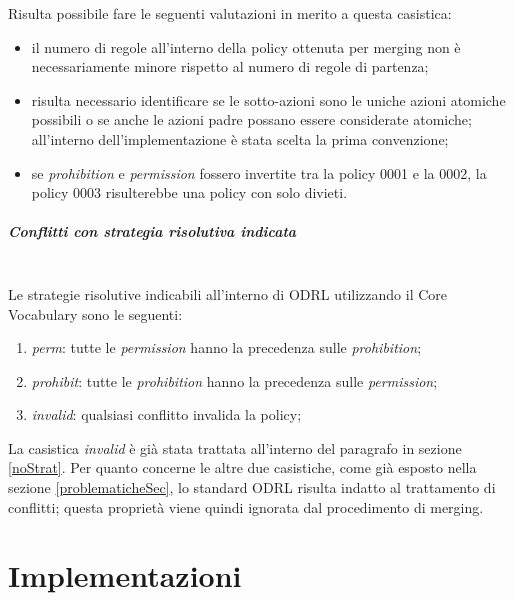 \documentclass[12pt,a4paper,twoside]{book}
\begin{document}
Risulta possibile fare le seguenti valutazioni in merito a questa casistica:
\begin{itemize}
	\item il numero di regole all'interno della policy ottenuta per merging non è necessariamente minore rispetto al numero di regole di partenza;
	\item risulta necessario identificare se le sotto-azioni sono le uniche azioni atomiche possibili o se anche le azioni padre possano essere considerate atomiche; all'interno dell'implementazione è stata scelta la prima convenzione;
	\item se \textit{prohibition} e \textit{permission} fossero invertite tra la policy 0001 e la 0002, la policy 0003 risulterebbe una policy con solo divieti.
\end{itemize}
\paragraph{Conflitti con strategia risolutiva indicata}\mbox{}\\
Le strategie risolutive indicabili all'interno di ODRL utilizzando il Core Vocabulary sono le seguenti:
\begin{enumerate}
	\item \textit{perm}: tutte le \textit{permission} hanno la precedenza sulle \textit{prohibition};
	\item \textit{prohibit}: tutte le \textit{prohibition} hanno la precedenza sulle \textit{permission};
	\item \textit{invalid}: qualsiasi conflitto invalida la policy;
\end{enumerate}
La casistica \textit{invalid} è già stata trattata all'interno del paragrafo in sezione \ref{noStrat}. Per quanto concerne le altre due casistiche, come già esposto nella sezione \ref{problematicheSec}, lo standard ODRL risulta indatto al trattamento di conflitti; questa proprietà viene quindi ignorata dal procedimento di merging.

\chapter{Implementazioni}\label{implementazioniCh}
\end{document}
